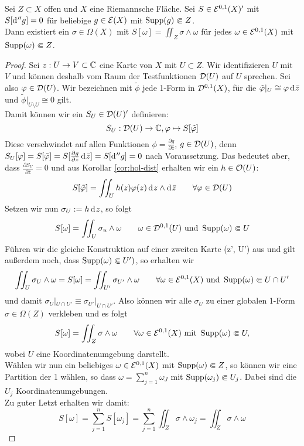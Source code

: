 \begin{lemma}
  \label{lemma:funktional-explizit}
  Sei $Z \subset X$ offen und $X$ eine Riemannsche Fläche. Sei $S \in
  \mathcal{E}^{0,1}(X)'$ mit $S[\d[''g]] = 0$ für beliebige $g \in \mathcal{E}(X)$
  mit $\operatorname{Supp}(g) \Subset Z$. \\
  Dann existiert ein $\sigma \in \Omega(X)$ mit $S[\omega] = \iint_Z
  \sigma \wedge \omega$ für jedes $\omega \in \mathcal{E}^{0,1}(X)$ mit
  $\operatorname{Supp}(\omega) \Subset Z$.
\end{lemma}

\begin{proof}
  Sei $z: U \rightarrow V \subset \mathbb{C}$ eine Karte von $X$ mit $U \subset
  Z$. Wir identifizieren $U$ mit $V$ und können deshalb vom Raum der
  Testfunktionen $\mathcal{D}(U)$ auf $U$ sprechen. Sei also $\varphi \in
  \mathcal{D}(U)$. Wir bezeichnen mit $\tilde \phi$ jede 1-Form in
  $\mathcal{D}^{0,1}(X)$, für die $\tilde \phi|_U \cong \phi \d[\bar z]$ und
  $\tilde \phi |_{U \setminus U} \cong 0$ gilt. \\
  Damit können wir ein $S_U \in \mathcal{D}(U)'$ definieren:
  \[
  S_U: \mathcal{D}(U) \rightarrow \mathbb{C}, \varphi \mapsto S[\tilde {\varphi}]
  \]
  Diese verschwindet auf allen Funktionen $\phi = \frac{\partial
    g}{\partial \bar z}$, $g \in \mathcal{D}(U)$, denn $S_U[\phi] = S[\tilde
  \phi] = S[ \frac{\partial g}{\partial \bar z} \d[\bar z]] =
  S[\d[''g]] = 0$ nach Voraussetzung. Das bedeutet aber, dass
  $\frac{\partial S_U}{\partial \bar z} = 0$ und aus Korollar
  \ref{cor:hol-dist} erhalten wir ein $h \in \mathcal{O}(U)$:
  \[
  S[\tilde \phi] = \iint_U h(z) \phi(z) \d[z] \wedge \d[\bar z] \qquad
  \forall \phi \in \dist(U)
  \]
  Setzen wir nun $\sigma_U := h \d[z]$, so folgt
  \[
  S[\omega] = \iint_U \sigma_u \wedge \omega \qquad \omega \in
  \mathcal{D}^{0,1}(U) \text{ und } \operatorname{Supp}(\omega) \Subset U
  \]
  Führen wir die gleiche Konstruktion auf einer zweiten Karte (z', U')
  aus und gilt außerdem noch, dass $\operatorname{Supp}(\omega) \Subset U')$, so
  erhalten wir
  \[
  \iint_U \sigma_U \wedge \omega = S[\omega] = \iint_{U'} \sigma_{U'}
  \wedge \omega \qquad \forall \omega \in \mathcal{E}^{0,1}(X) \text{ und }
  \operatorname{Supp}(\omega) \Subset U \cap U'
  \]
  und damit $\sigma_U|_{U \cap U'} \equiv \sigma_{U'}|_{U \cap
    U'}$. Also können wir alle $\sigma_U$ zu einer globalen 1-Form
  $\sigma \in \Omega(Z)$ verkleben und es folgt
  \[
  S[\omega] = \iint_Z \sigma \wedge \omega \qquad \forall \omega \in
  \mathcal{E}^{0,1}(X) \text{ mit } \operatorname{Supp}(\omega) \Subset U,
  \]
  wobei $U$ eine Koordinatenumgebung darstellt. \\
  Wählen wir nun ein beliebiges $\omega \in \mathcal{E}^{0,1}(X)$ mit
  $\operatorname{Supp}(\omega) \Subset Z$, so können wir eine Partition der 1
  wählen, so dass $\omega = \sum_{j=1}^n \omega_J$ mit
  $\operatorname{Supp}(\omega_j) \Subset U_j$. Dabei sind die $U_j$
  Koordinatenumgebungen. \\
  Zu guter Letzt erhalten wir damit:
  \[
  S[\omega] = \sum_{j=1}^n S[\omega_j] = \sum_{j=1}^n \iint_Z \sigma
  \wedge \omega_j = \iint_Z \sigma \wedge \omega
  \]
\end{proof}

